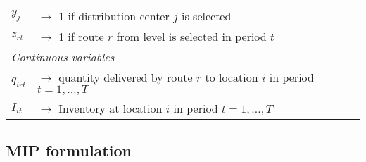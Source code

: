 \documentclass[10pt, a4paper]{article}
\begin{document}
\begin{table}
\begin{tabular}{ll}
        $y_{j}$ & $\rightarrow$ 1 if distribution center $j$ is selected \\
        $z_{rt}$ & $\rightarrow$ 1 if route $r$ from level is selected in period $t$\\
        \hline
        \multicolumn{2}{l}{\textit{Continuous variables}}\\
        $q_{irt}$ & $\rightarrow$ quantity delivered by route $r$ to location $i$ in period $t=1,\ldots,T$\\
        $I_{it}$ & $\rightarrow$ Inventory at location $i$ in period $t=1,\ldots,T$\\
        \hline
    \end{tabular}
\end{table}

\subsection{MIP formulation}\label{subsection:MIP}
\end{document}
